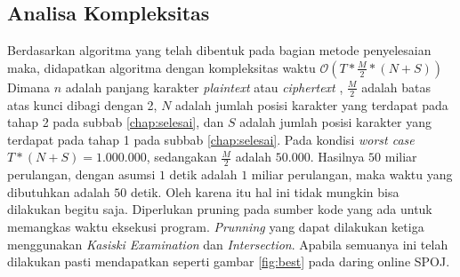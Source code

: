 \subsection{Analisa Kompleksitas}
Berdasarkan algoritma yang telah dibentuk pada bagian metode penyelesaian maka, didapatkan algoritma dengan kompleksitas waktu $\mathcal{O}(T*\frac{M}{2}*(N+S))$ 
	Dimana $n$ adalah panjang karakter \textit{plaintext} atau \textit{ciphertext} , $\frac{M}{2}$ adalah batas atas kunci dibagi dengan 2, $N$ adalah jumlah posisi karakter yang terdapat pada tahap 2 pada subbab \ref{chap:selesai}, dan $S$ adalah jumlah posisi karakter yang terdapat pada tahap 1 pada subbab \ref{chap:selesai}. Pada kondisi \textit{worst case} $T*(N+S)=1.000.000$, sedangakan $\frac{M}{2}$ adalah $50.000$. Hasilnya $50$ miliar perulangan, dengan asumsi $1$ detik adalah $1$ miliar perulangan, maka waktu yang dibutuhkan adalah $50$ detik. Oleh karena itu hal ini tidak mungkin bisa dilakukan begitu saja. Diperlukan pruning pada sumber kode yang ada untuk memangkas waktu eksekusi program. \textit{Prunning} yang dapat dilakukan ketiga menggunakan \textit{Kasiski Examination} dan \textit{Intersection}. Apabila semuanya ini telah dilakukan pasti mendapatkan seperti gambar \ref{fig:best} pada daring online SPOJ.
